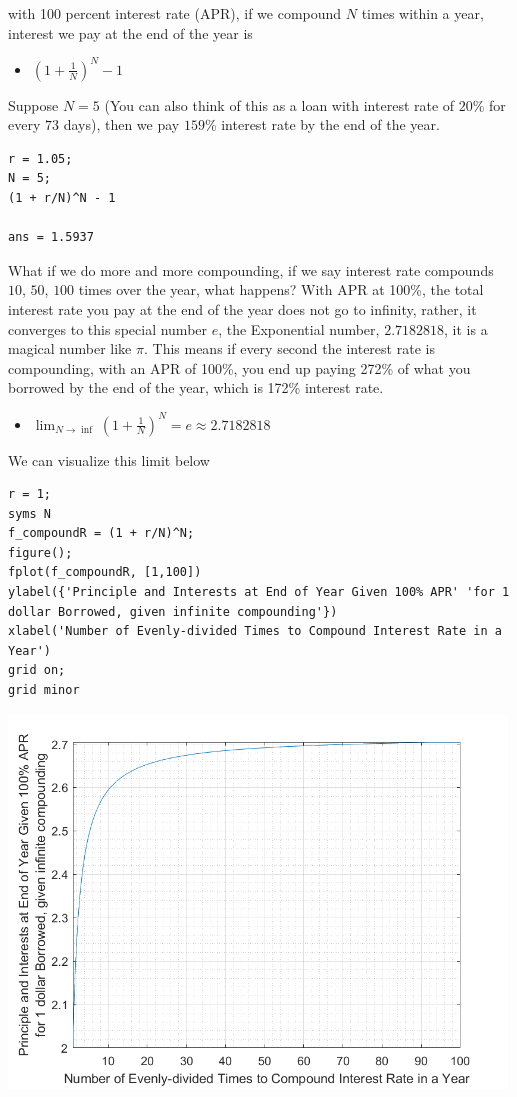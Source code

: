 \documentclass[
]{book}
\providecommand{\tightlist}{%
  \setlength{\itemsep}{0pt}\setlength{\parskip}{0pt}}
\begin{document}
with 100 percent interest rate (APR), if we compound \(N\) times within a
year, interest we pay at the end of the year is

\begin{itemize}
\tightlist
\item
  \(\displaystyle (1+\frac{1}{N})^N -1\)
\end{itemize}

Suppose \(N=5\) (You can also think of this as a loan with interest rate
of \(20\)\% for every \(73\) days), then we pay \(159\)\% interest rate by the
end of the year.

\begin{verbatim}
r = 1.05;
N = 5;
(1 + r/N)^N - 1

ans = 1.5937
\end{verbatim}

What if we do more and more compounding, if we say interest rate
compounds \(10\), \(50\), \(100\) times over the year, what happens? With APR
at 100\%, the total interest rate you pay at the end of the year does not
go to infinity, rather, it converges to this special number \(e\), the
Exponential number, \(2.7182818\), it is a magical number like \(\pi\). This
means if every second the interest rate is compounding, with an APR of
100\%, you end up paying 272\% of what you borrowed by the end of the
year, which is 172\% interest rate.

\begin{itemize}
\tightlist
\item
  \(\displaystyle \lim_{N\to \inf } (1+\frac{1}{N})^N =e\approx 2.7182818\)
\end{itemize}

We can visualize this limit below

\begin{verbatim}
r = 1;
syms N
f_compoundR = (1 + r/N)^N;
figure();
fplot(f_compoundR, [1,100])
ylabel({'Principle and Interests at End of Year Given 100% APR' 'for 1 dollar Borrowed, given infinite compounding'})
xlabel('Number of Evenly-divided Times to Compound Interest Rate in a Year')
grid on;
grid minor
\end{verbatim}

\includegraphics[width=5.20833in,height=\textheight]{img/exponential_images/figure_1.png}
\end{document}
